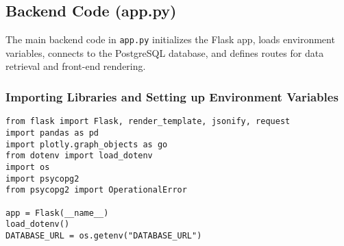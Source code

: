 

\subsection{Backend Code (app.py)}

The main backend code in \texttt{app.py} initializes the Flask app, loads environment variables, connects to the PostgreSQL database, and defines routes for data retrieval and front-end rendering.

\subsubsection{Importing Libraries and Setting up Environment Variables}
\begin{lstlisting}[style=Python, caption={Importing Libraries and Setting up Environment Variables}]
from flask import Flask, render_template, jsonify, request
import pandas as pd
import plotly.graph_objects as go
from dotenv import load_dotenv
import os
import psycopg2
from psycopg2 import OperationalError

app = Flask(__name__)
load_dotenv()
DATABASE_URL = os.getenv("DATABASE_URL")
\end{lstlisting}

